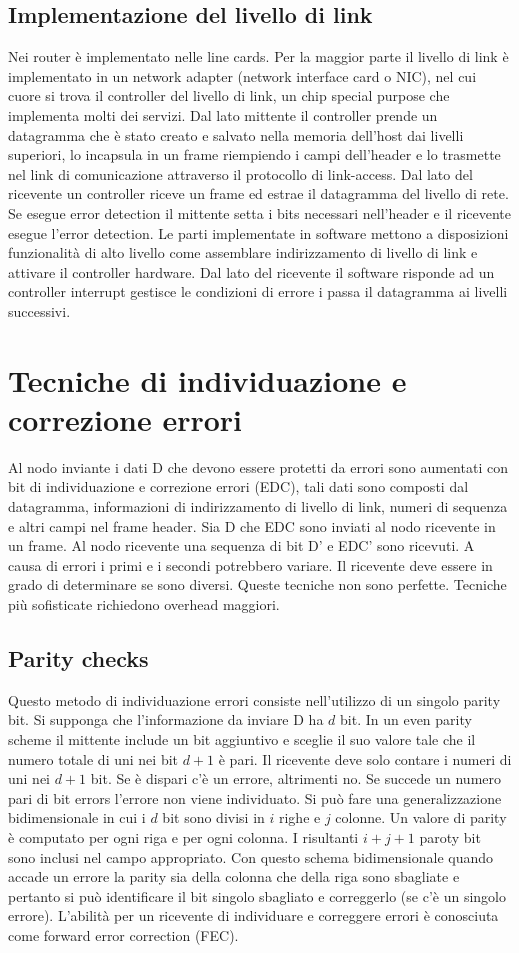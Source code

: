\subsection{Implementazione del livello di link}
Nei router \`e implementato nelle line cards. Per la maggior parte il livello di link \`e implementato in un network adapter (network interface card o NIC), nel cui cuore si trova il controller del livello di link, un chip
special purpose che implementa molti dei servizi. Dal lato mittente il controller prende un datagramma che \`e stato creato e salvato nella memoria dell'host dai livelli superiori, lo incapsula in un frame 
riempiendo i campi dell'header e lo trasmette nel link di comunicazione attraverso il protocollo di link-access. Dal lato del ricevente un controller riceve un frame ed estrae il datagramma del livello di rete. Se 
esegue error detection il mittente setta i bits necessari nell'header e il ricevente esegue l'error detection. Le parti implementate in software mettono a disposizioni funzionalit\`a di alto livello come assemblare
indirizzamento di livello di link e attivare il controller hardware. Dal lato del ricevente il software risponde ad un controller interrupt gestisce le condizioni di errore i passa il datagramma ai livelli successivi. 
\section{Tecniche di individuazione e correzione errori}
Al nodo inviante i dati D che devono essere protetti da errori sono aumentati con bit di individuazione e correzione errori (EDC), tali dati sono composti dal datagramma, informazioni di indirizzamento di livello 
di link, numeri di sequenza e altri campi nel frame header. Sia D che EDC sono inviati al nodo ricevente in un frame. Al nodo ricevente una sequenza di bit D' e EDC' sono ricevuti. A causa di errori i primi e i 
secondi potrebbero variare. Il ricevente deve essere in grado di determinare se sono diversi. Queste tecniche non sono perfette. Tecniche pi\`u sofisticate richiedono overhead maggiori.
\subsection{Parity checks}
Questo metodo di individuazione errori consiste nell'utilizzo di un singolo parity bit. Si supponga che l'informazione da inviare D ha $d$ bit. In un even parity scheme il mittente include un bit aggiuntivo e 
sceglie il suo valore tale che il numero totale di uni nei bit $d+1$ \`e pari. Il ricevente deve solo contare i numeri di uni nei $d+1$ bit. Se \`e dispari c'\`e un errore, altrimenti no. Se succede un numero pari di bit 
errors l'errore non viene individuato. Si pu\`o fare una generalizzazione bidimensionale in cui i $d$ bit sono divisi in $i$ righe e $j$ colonne. Un valore di parity \`e computato per ogni riga e per ogni colonna. I 
risultanti $i+j+1$ paroty bit sono inclusi nel campo appropriato. Con questo schema bidimensionale quando accade un errore la parity sia della colonna che della riga sono sbagliate e pertanto si pu\`o 
identificare il bit singolo sbagliato e correggerlo (se c'\`e un singolo errore). L'abilit\`a per un ricevente di individuare e correggere errori \`e conosciuta come forward error correction (FEC). 
